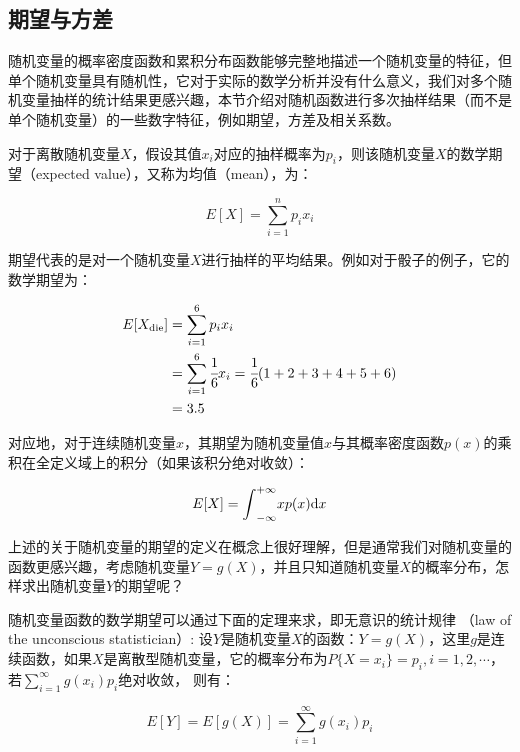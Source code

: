 \subsection{期望与方差}
随机变量的概率密度函数和累积分布函数能够完整地描述一个随机变量的特征，但单个随机变量具有随机性，它对于实际的数学分析并没有什么意义，我们对多个随机变量抽样的统计结果更感兴趣，本节介绍对随机函数进行多次抽样结果（而不是单个随机变量）的一些数字特征，例如期望，方差及相关系数。

对于离散随机变量$X$，假设其值$x_i$对应的抽样概率为$p_i$，则该随机变量$X$的数学期望（expected value），又称为均值（mean），为：

\begin{equation}\label{eq:mc-expected-value}
	E[X]=\sum_{i=1}^{n}p_i x_i
\end{equation} 

期望代表的是对一个随机变量$X$进行抽样的平均结果。例如对于骰子的例子，它的数学期望为：

\begin{equation}
	\begin{aligned}
		E[X_{\rm die}]&=\sum_{i=1}^{6}p_i x_i\\
		&=\sum_{i=1}^{6} \cfrac{1}{6}x_i = \cfrac{1}{6}(1+2+3+4+5+6)\\
		&=3.5
	\end{aligned}
\end{equation}

对应地，对于连续随机变量$x$，其期望为随机变量值$x$与其概率密度函数$p(x)$的乘积在全定义域上的积分（如果该积分绝对收敛）：

\begin{equation}\label{eq:mc-continuous-e}
	E[X]={\rm \int}_{-\infty}^{+\infty}xp(x){\rm d}x
\end{equation}

上述的关于随机变量的期望的定义在概念上很好理解，但是通常我们对随机变量的函数更感兴趣，考虑随机变量$Y=g(X)$，并且只知道随机变量$X$的概率分布，怎样求出随机变量$Y$的期望呢？

随机变量函数的数学期望可以通过下面的定理来求，即无意识的统计规律
（law of the unconscious statistician）: 设$Y$是随机变量$X$的函数：$Y=g(X)$，这里$g$是连续函数，如果$X$是离散型随机变量，它的概率分布为$P\{X=x_i\}=p_i,i=1,2,\cdots$，若$\sum^{\infty}_{i=1}g(x_i)p_i$绝对收敛， 则有：

\begin{equation}
	E[Y]=E[g(X)]=\sum^{\infty}_{i=1}g(x_i)p_i
\end{equation}

